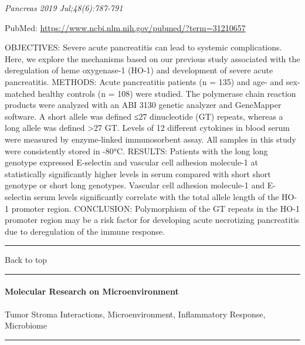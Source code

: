 \documentclass[]{article}
\let\oldparagraph\paragraph
\renewcommand{\paragraph}[1]{\oldparagraph{#1}\mbox{}}
\begin{document}
\emph{Pancreas 2019 Jul;48(6):787-791}

PubMed: \url{https://www.ncbi.nlm.nih.gov/pubmed/?term=31210657}

OBJECTIVES: Severe acute pancreatitis can lead to systemic
complications. Here, we explore the mechanisms based on our previous
study associated with the deregulation of heme oxygenase-1 (HO-1) and
development of severe acute pancreatitis. METHODS: Acute pancreatitis
patients (n = 135) and age- and sex-matched healthy controls (n = 108)
were studied. The polymerase chain reaction products were analyzed with
an ABI 3130 genetic analyzer and GeneMapper software. A short allele was
defined ≤27 dinucleotide (GT) repeats, whereas a long allele was defined
\textgreater{}27 GT. Levels of 12 different cytokines in blood serum
were measured by enzyme-linked immunosorbent assay. All samples in this
study were consistently stored in -80°C. RESULTS: Patients with the long
long genotype expressed E-selectin and vascular cell adhesion molecule-1
at statistically significantly higher levels in serum compared with
short short genotype or short long genotypes. Vascular cell adhesion
molecule-1 and E-selectin serum levels significantly correlate with the
total allele length of the HO-1 promoter region. CONCLUSION:
Polymorphism of the GT repeats in the HO-1 promoter region may be a risk
factor for developing acute necrotizing pancreatitis due to deregulation
of the immune response.

{}

{}

\begin{center}\rule{0.5\linewidth}{\linethickness}\end{center}

Back to top

\begin{center}\rule{0.5\linewidth}{\linethickness}\end{center}

\pagebreak

\hypertarget{molecular-research-on-microenvironment}{%
\paragraph{Molecular Research on
Microenvironment}\label{molecular-research-on-microenvironment}}

Tumor Stroma Interactions, Microenvironment, Inflammatory Response,
Microbiome

\begin{center}\rule{0.5\linewidth}{\linethickness}\end{center}
\end{document}
